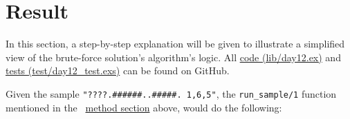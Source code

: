 \documentclass[a4paper,11pt]{article}
\begin{document}
\section*{Result}
\label{sec:result}
In this section, a step-by-step explanation will be given to illustrate
a simplified view of the brute-force solution's algorithm's logic.
All
\href{https://github.com/VincentFerrigan/kth-id1019-programming-ii/tree/main/tasks/5/day12/lib/day12.ex}{code (lib/day12.ex)} and %
\href{https://github.com/VincentFerrigan/kth-id1019-programming-ii/tree/main/tasks/5/day12/test/day12_test.exs}{tests (test/day12\_test.exs)}
can be found on GitHub.

Given the sample
\texttt{"????.######..#####. 1,6,5"}, the
\texttt{run_sample/1} function mentioned in the
~\hyperref[sec:ttd]{method section} above, would do the following:
\end{document}
